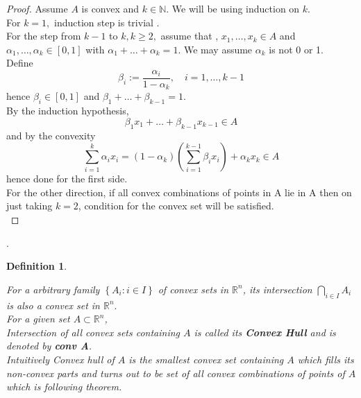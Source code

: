 \documentclass[oneside]{book}
\newtheorem{mydef}{Definition}[section]
\begin{document}
	\begin{proof}
		
		Assume $A$ is convex and $k \in \mathbb{N} .$ We will be using induction on $k$. \\ For $k=1,$ induction step is trivial  .\\
		
		For the step from $k-1$ to $k, k \geq 2,$ assume that  ,  $x_{1}, \ldots, x_{k} \in A$ and \\
		$\alpha_{1}, \ldots, \alpha_{k} \in[0,1]$ with $\alpha_{1}+\ldots+\alpha_{k}=1 .$ We may assume $\alpha_{k}$ is not 0 or 1.\\ Define 
		$$
		\beta_{i}:=\frac{\alpha_{i}}{1-\alpha_{k}}, \quad i=1, \ldots, k-1
		$$
		hence $\beta_{i} \in[0,1]$ and $\beta_{1}+\ldots+\beta_{k-1}=1 .$ \\
		By the induction hypothesis, $$\beta_{1} x_{1}+\ldots+\beta_{k-1} x_{k-1} \in A$$
		and by the convexity
		$$
		\sum_{i=1}^{k} \alpha_{i} x_{i}=\left(1-\alpha_{k}\right)\left(\sum_{i=1}^{k-1} \beta_{i} x_{i}\right)+\alpha_{k} x_{k} \in A
		$$
		hence done for the first side.\\
		
		For the other direction, if all convex combinations of points in A lie in A then on just taking $k =2$, condition for the convex set will be satisfied.\\
		
	\end{proof}.
	
	\begin{mydef}  \label{d:4}
		
		
		For a arbitrary family  $\left\{A_{i}: i \in I\right\}$ of convex sets in   $\mathbb{R}^{n}$, its intersection $\bigcap_{i \in I} A_{i}$ is also a convex set in $\mathbb{R}^{n}.$  \\
		For a given set $A \subset \mathbb{R}^{n}$,\\ Intersection of all convex sets containing $A$ is called its  \textbf{Convex Hull} and is denoted by  \textbf{conv A}.\\
		Intuitively Convex hull of $A$  is the smallest convex set containing $A$ which fills its non-convex parts and turns out to be set of all convex combinations of points of $A$ which is following theorem.
		
	\end{mydef}
	
	
	
\end{document}
